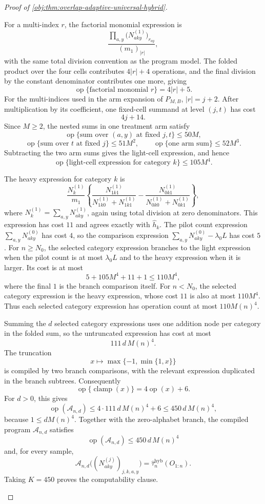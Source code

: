 \documentclass[11pt]{article}
\begin{document}
\begin{proof}[Proof of \cref{obj:thm:overlap-adaptive-universal-hybrid}]
\begin{enumerate}
For a multi-index \(r\), the factorial monomial expression is
\[
\frac{\prod_{a,y}\bigl(N^{(1)}_{aky}\bigr)_{r_{ay}}}
     {(m_1)_{|r|}},
\]
with the same total division convention as the program model.  The folded product over the four cells contributes \(4|r|+4\) operations, and the final division by the constant denominator contributes one more, giving
\[
\operatorname{op}\{\text{factorial monomial }r\}=4|r|+5.
\]
For the multi-indices used in the arm expansion of \(P_{M,B}\), \(|r|=j+2\).  After multiplication by its coefficient, one fixed-cell summand at level \((j,t)\) has cost
\[
4j+14.
\]
Since \(M\ge2\), the nested sums in one treatment arm satisfy
\[
\operatorname{op}\{\text{sum over }(a,y)\text{ at fixed }j,t\}
\le 50M,
\]
\[
\operatorname{op}\{\text{sum over }t\text{ at fixed }j\}
\le 51M^2,
\qquad
\operatorname{op}\{\text{one arm sum}\}
\le 52M^3.
\]
Subtracting the two arm sums gives the light-cell expression, and hence
\[
\operatorname{op}\{\text{light-cell expression for category }k\}
\le 105M^4.
\]

The heavy expression for category \(k\) is
\[
\frac{N_k^{(1)}}{m_1}
\left\{
\frac{N^{(1)}_{1k1}}{N^{(1)}_{1k0}+N^{(1)}_{1k1}}
-
\frac{N^{(1)}_{0k1}}{N^{(1)}_{0k0}+N^{(1)}_{0k1}}
\right\},
\]
where \(N_k^{(1)}=\sum_{a,y}N^{(1)}_{aky}\), again using total division at zero denominators.  This expression has cost \(11\) and agrees exactly with \(\widehat h_k\).  The pilot count expression \(\sum_{a,y}N^{(0)}_{aky}\) has cost \(4\), so the comparison expression \(\sum_{a,y}N^{(0)}_{aky}-\lambda_0L\) has cost \(5\).  For \(n\ge N_0\), the selected category expression branches to the light expression when the pilot count is at most \(\lambda_0L\) and to the heavy expression when it is larger.  Its cost is at most
\[
5+105M^4+11+1\le 110M^4,
\]
where the final \(1\) is the branch comparison itself.  For \(n<N_0\), the selected category expression is the heavy expression, whose cost \(11\) is also at most \(110M^4\).  Thus each selected category expression has operation count at most \(110M(n)^4\).

Summing the \(d\) selected category expressions uses one addition node per category in the folded sum, so the untruncated expression has cost at most
\[
111\,d\,M(n)^4.
\]
The truncation
\[
x\longmapsto \max\{-1,\min\{1,x\}\}
\]
is compiled by two branch comparisons, with the relevant expression duplicated in the branch subtrees.  Consequently
\[
\operatorname{op}\{\operatorname{clamp}(x)\}
=4\operatorname{op}(x)+6.
\]
For \(d>0\), this gives
\[
\operatorname{op}(\mathcal A_{n,d})
\le 4\cdot 111\,d\,M(n)^4+6
\le 450\,d\,M(n)^4,
\]
because \(1\le dM(n)^4\).  Together with the zero-alphabet branch, the compiled program \(\mathcal A_{n,d}\) satisfies
\[
\operatorname{op}(\mathcal A_{n,d})
\le 450\,d\,M(n)^4
\]
and, for every sample,
\[
\mathcal A_{n,d}\bigl((N^{(j)}_{aky})_{j,k,a,y}\bigr)
=
\widehat\tau_n^{\mathrm{hyb}}(O_{1:n}).
\]
Taking \(K=450\) proves the computability clause.


\end{enumerate}
\end{proof}
\end{document}
